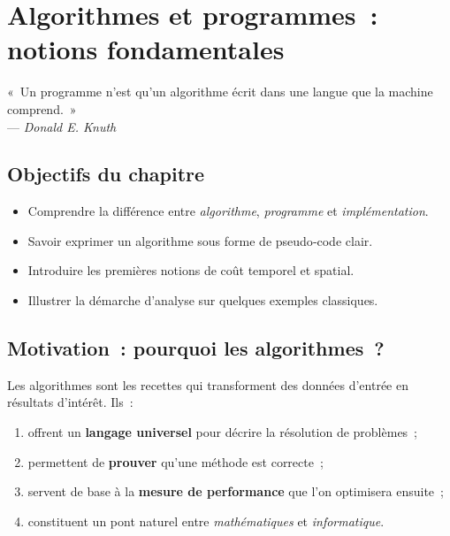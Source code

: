 
\chapter{Algorithmes et programmes : notions fondamentales}

\begin{flushright}\small
« Un programme n'est qu'un algorithme écrit dans une langue que la machine
comprend. »\\[-0.2em]
— \textit{Donald E. Knuth}
\end{flushright}

\section*{Objectifs du chapitre}
\begin{itemize}[label=\small$\blacktriangleright$]
  \item Comprendre la différence entre \emph{algorithme}, \emph{programme} et \emph{implémentation}.
  \item Savoir exprimer un algorithme sous forme de pseudo‑code clair.
  \item Introduire les premières notions de coût temporel et spatial.
  \item Illustrer la démarche d'analyse sur quelques exemples classiques.
\end{itemize}
\vspace{0.5em}

\section{Motivation : pourquoi les algorithmes ?}

Les algorithmes sont les \og recettes \fg{} qui transforment des données d'entrée
en résultats d'intérêt. Ils :
\begin{enumerate}
  \item offrent un \textbf{langage universel} pour décrire la résolution de problèmes ;
  \item permettent de \textbf{prouver} qu'une méthode est correcte ;
  \item servent de base à la \textbf{mesure de performance} que l'on optimisera
        ensuite ;
  \item constituent un pont naturel entre \emph{mathématiques} et \emph{informatique}.
\end{enumerate}

